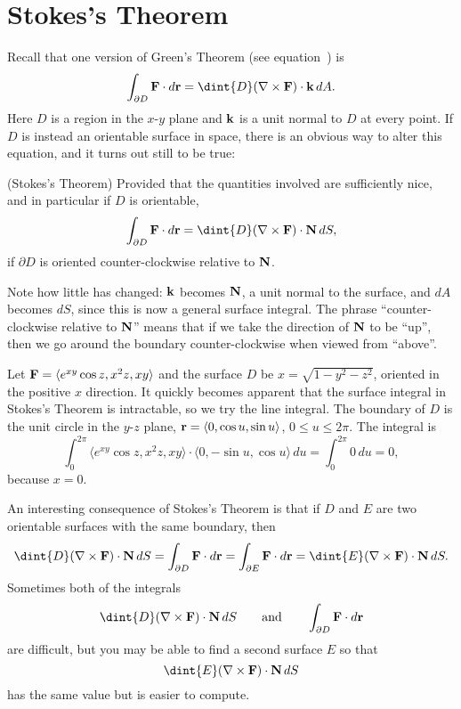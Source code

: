 \section{Stokes's Theorem}{}{}

Recall that one version of Green's Theorem (see
equation~) is
$$\int_{\partial D} {\bf F}\cdot d{\bf r}
=\dint{D}(\nabla\times {\bf F})\cdot{\bf k}\,dA.
$$
Here $D$ is a region in the $x$-$y$ plane and $\bf k$ is a unit normal
to $D$ at every point. If $D$ is instead an orientable surface in
space, there is an obvious way to alter this equation, and it turns
out still to be true:

\begin{theorem} (Stokes's Theorem) Provided that the quantities involved are
sufficiently nice, and in particular if $D$ is orientable, 
$$\int_{\partial D} {\bf F}\cdot d{\bf r}
=\dint{D}(\nabla\times {\bf F})\cdot{\bf N}\,dS,
$$
if $\partial D$ is oriented counter-clockwise relative to $\bf N$.
\end{theorem}

Note how little has changed: $\bf k$ becomes $\bf N$, a unit normal to
the surface, and $dA$ becomes $dS$, since this is now a general
surface integral. The phrase ``counter-clockwise relative to $\bf N$''
means that if we take the direction of $\bf N$ to be ``up'', then we
go around the boundary counter-clockwise when viewed from ``above''.

\begin{example} Let 
${\bf F}=\langle e^{xy}\cos z,x^2z,xy\rangle$ 
and the surface $D$ be $x=\sqrt{1-y^2-z^2}$, oriented in
the positive $x$ direction.
It quickly becomes apparent that the surface integral in Stokes's
Theorem is intractable, so we try the line integral. The boundary of
$D$ is the unit circle in the $y$-$z$ plane, ${\bf r}=\langle 0,\cos
u,\sin u\rangle$, $0\le u\le 2\pi$. The integral is
$$\int_0^{2\pi} \langle e^{xy}\cos z,x^2z,xy\rangle\cdot
\langle 0,-\sin u,\cos u\rangle\,du=
\int_0^{2\pi} 0\,du = 0,$$
because $x=0$.
\end{example}

An interesting consequence of Stokes's Theorem is that if $D$ and $E$
are two orientable surfaces with the same boundary, then
$$
\dint{D}(\nabla\times {\bf F})\cdot{\bf N}\,dS
=\int_{\partial D} {\bf F}\cdot d{\bf r}
=\int_{\partial E} {\bf F}\cdot d{\bf r}
=\dint{E}(\nabla\times {\bf F})\cdot{\bf N}\,dS.
$$
Sometimes both of the integrals 
$$\dint{D}(\nabla\times {\bf F})\cdot{\bf N}\,dS
\qquad\hbox{and}\qquad\int_{\partial D} {\bf F}\cdot d{\bf r}$$
are difficult, but you may be able to find a second surface $E$ so
that
$$\dint{E}(\nabla\times {\bf F})\cdot{\bf N}\,dS
$$
has the same value but is easier to compute.

